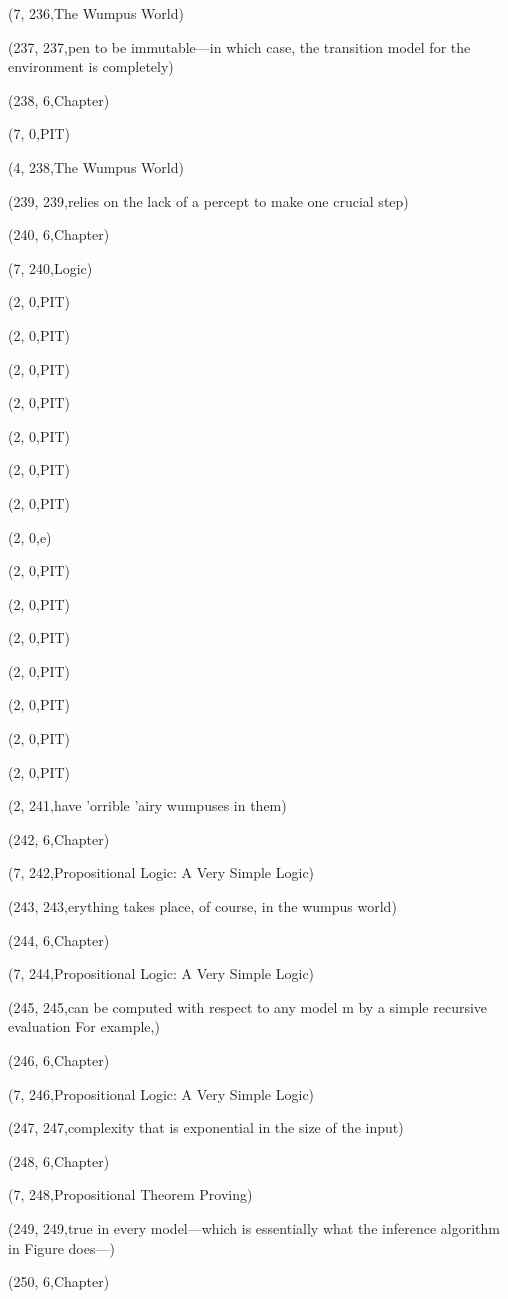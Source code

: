 (7, 236,The Wumpus World)

(237, 237,pen to be immutable—in which case, the transition model for the environment is completely)

(238, 6,Chapter)

(7, 0,PIT)

(4, 238,The Wumpus World)

(239, 239,relies on the lack of a percept to make one crucial step)

(240, 6,Chapter)

(7, 240,Logic)

(2, 0,PIT)

(2, 0,PIT)

(2, 0,PIT)

(2, 0,PIT)

(2, 0,PIT)

(2, 0,PIT)

(2, 0,PIT)

(2, 0,e)

(2, 0,PIT)

(2, 0,PIT)

(2, 0,PIT)

(2, 0,PIT)

(2, 0,PIT)

(2, 0,PIT)

(2, 0,PIT)

(2, 241,have ’orrible ’airy wumpuses in them)

(242, 6,Chapter)

(7, 242,Propositional Logic: A Very Simple Logic)

(243, 243,erything takes place, of course, in the wumpus world)

(244, 6,Chapter)

(7, 244,Propositional Logic: A Very Simple Logic)

(245, 245,can be computed with respect to any model m by a simple recursive evaluation For example,)

(246, 6,Chapter)

(7, 246,Propositional Logic: A Very Simple Logic)

(247, 247,complexity that is exponential in the size of the input)

(248, 6,Chapter)

(7, 248,Propositional Theorem Proving)

(249, 249,true in every model—which is essentially what the inference algorithm in Figure  does—)

(250, 6,Chapter)

